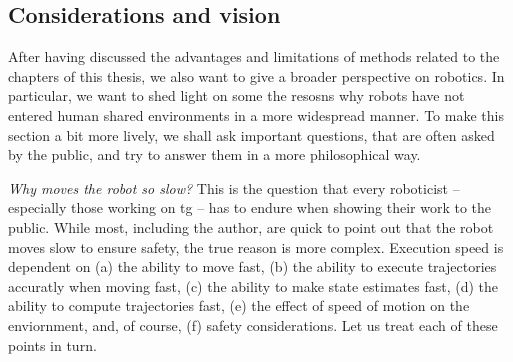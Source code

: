 \subsection{Considerations and vision}
\label{sec:discussion_vision}

After having discussed the advantages and limitations of
methods related to the chapters of this thesis, we also want
to give a broader perspective on robotics. In particular, we
want to shed light on some the resosns why robots have not
entered human shared environments in a more widespread
manner. To make this section a bit more lively, we shall ask
important questions, that are often asked by the public, and
try to answer them in a more philosophical way.


\textit{Why moves the robot so slow?} This is the question that every roboticist
-- especially those working on \ac{tg} --
has to endure when showing their work to the public. While most, including the
author, are quick to point out that the robot moves slow to ensure safety, the
true reason is more complex. Execution speed is dependent on
(a) the ability to move fast,
(b) the ability to execute trajectories accuratly when moving fast,
(c) the ability to make state estimates fast,
(d) the ability to compute trajectories fast,
(e) the effect of speed of motion on the enviornment,
and, of course,  (f) safety considerations.
Let us treat each of these
points in turn. 
